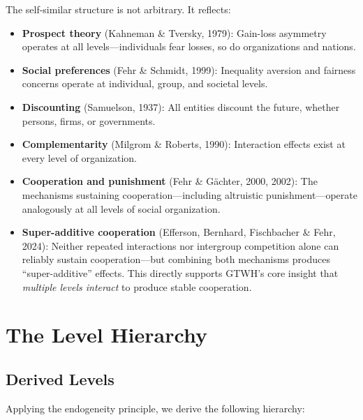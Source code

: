 \documentclass[12pt,a4paper]{article}
\begin{document}
The self-similar structure is not arbitrary. It reflects:
\begin{itemize}[nosep]
\item \textbf{Prospect theory} (Kahneman \& Tversky, 1979): Gain-loss asymmetry 
operates at all levels---individuals fear losses, so do organizations and nations.
\item \textbf{Social preferences} (Fehr \& Schmidt, 1999): Inequality aversion 
and fairness concerns operate at individual, group, and societal levels.
\item \textbf{Discounting} (Samuelson, 1937): All entities discount the future, 
whether persons, firms, or governments.
\item \textbf{Complementarity} (Milgrom \& Roberts, 1990): Interaction effects 
exist at every level of organization.
\item \textbf{Cooperation and punishment} (Fehr \& Gächter, 2000, 2002): The 
mechanisms sustaining cooperation---including altruistic punishment---operate 
analogously at all levels of social organization.
\item \textbf{Super-additive cooperation} (Efferson, Bernhard, Fischbacher \& Fehr, 2024): 
Neither repeated interactions nor intergroup competition alone can reliably sustain 
cooperation---but combining both mechanisms produces ``super-additive'' effects. 
This directly supports GTWH's core insight that \textit{multiple levels interact} 
to produce stable cooperation.
\end{itemize}

\section{The Level Hierarchy}
\label{sec:hierarchy}

\subsection{Derived Levels}

Applying the endogeneity principle, we derive the following hierarchy:
\end{document}

